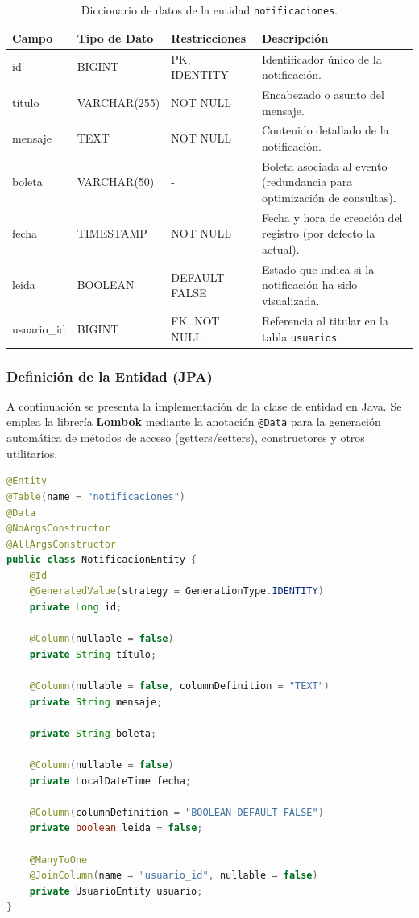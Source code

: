 \begin{table}[H]
\centering
\small
\begin{tabularx}{\textwidth}{|l|l|l|X|}
\hline
\rowcolor{azulESCOM} 
\color{white}\textbf{Campo} & \color{white}\textbf{Tipo de Dato} & \color{white}\textbf{Restricciones} & \color{white}\textbf{Descripci\'on} \\ \hline
id & BIGINT & PK, IDENTITY & Identificador \'unico de la notificaci\'on. \\ \hline
título & VARCHAR(255) & NOT NULL & Encabezado o asunto del mensaje. \\ \hline
mensaje & TEXT & NOT NULL & Contenido detallado de la notificaci\'on. \\ \hline
boleta & VARCHAR(50) & - & Boleta asociada al evento (redundancia para optimizaci\'on de consultas). \\ \hline
fecha & TIMESTAMP & NOT NULL & Fecha y hora de creaci\'on del registro (por defecto la actual). \\ \hline
leida & BOOLEAN & DEFAULT FALSE & Estado que indica si la notificaci\'on ha sido visualizada. \\ \hline
usuario\_id & BIGINT & FK, NOT NULL & Referencia al titular en la tabla \texttt{usuarios}. \\ \hline
\end{tabularx}
\caption{Diccionario de datos de la entidad \texttt{notificaciones}.}
\label{tab:dict_notificaciones}
\end{table}

\subsubsection{Definici\'on de la Entidad (JPA)}
A continuaci\'on se presenta la implementaci\'on de la clase de entidad en Java. Se emplea la librer\'ia \textbf{Lombok} mediante la anotaci\'on \texttt{@Data} para la generaci\'on autom\'atica de m\'etodos de acceso (getters/setters), constructores y otros utilitarios.

\begin{lstlisting}[language=Java, caption={Entidad Java para la gesti\'on de notificaciones.}, label={lst:java_notificacion}]
@Entity
@Table(name = "notificaciones")
@Data
@NoArgsConstructor
@AllArgsConstructor
public class NotificacionEntity {
    @Id
    @GeneratedValue(strategy = GenerationType.IDENTITY)
    private Long id;

    @Column(nullable = false)
    private String título;
    
    @Column(nullable = false, columnDefinition = "TEXT")
    private String mensaje;
    
    private String boleta;
    
    @Column(nullable = false)
    private LocalDateTime fecha;
    
    @Column(columnDefinition = "BOOLEAN DEFAULT FALSE")
    private boolean leida = false;

    @ManyToOne
    @JoinColumn(name = "usuario_id", nullable = false)
    private UsuarioEntity usuario;
}
\end{lstlisting}

